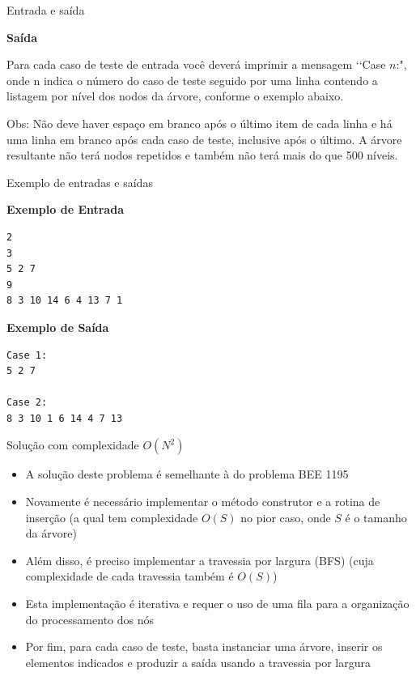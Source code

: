 \begin{frame}[fragile]{Entrada e saída}

\textbf{Saída}

Para cada caso de teste de entrada você deverá imprimir a mensagem \lq\lq Case $n$:", onde n indica o número do caso de teste seguido por uma linha contendo a listagem por nível dos nodos da árvore, conforme o exemplo abaixo. 

Obs: Não deve haver espaço em branco após o último item de cada linha e há uma linha em branco após cada caso de teste, inclusive após o último. A árvore resultante não terá nodos repetidos e também não terá mais do que 500 níveis.

\end{frame}


\begin{frame}[fragile]{Exemplo de entradas e saídas}

\begin{minipage}[t]{0.5\textwidth}
\textbf{Exemplo de Entrada}
\begin{verbatim}
2
3
5 2 7
9
8 3 10 14 6 4 13 7 1
\end{verbatim}
\end{minipage}
\begin{minipage}[t]{0.45\textwidth}
\textbf{Exemplo de Saída}
\begin{verbatim}
Case 1:
5 2 7

Case 2:
8 3 10 1 6 14 4 7 13
\end{verbatim}
\end{minipage}
\end{frame}

\begin{frame}[fragile]{Solução com complexidade $O(N^2)$}

    \begin{itemize}
        \item A solução deste problema é semelhante à do problema BEE 1195

        \item Novamente é necessário implementar o método construtor e a rotina de inserção 
            (a qual tem
            complexidade $O(S)$ no pior caso, onde $S$ é o tamanho da árvore)

        \item Além disso, é preciso implementar a travessia por largura (BFS)
            (cuja complexidade de cada travessia também é $O(S)$)

        \item Esta implementação é iterativa e requer o uso de uma fila para a organização do
            processamento dos nós

        \item Por fim, para cada caso de teste, basta instanciar uma árvore, inserir os elementos
            indicados e produzir a saída usando a travessia por largura
   \end{itemize}

\end{frame}

